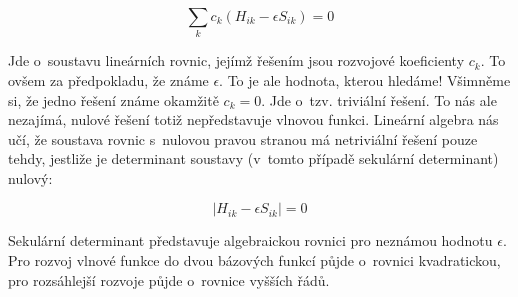   \begin{equation}
 \sum_k c_{k}\left(H_{ik}-\epsilon S_{ik}\right)=0
     \end{equation}
 
Jde o~soustavu lineárních rovnic, jejímž řešením jsou rozvojové koeficienty $c_k$. To ovšem za předpokladu, že známe $\epsilon$. To je ale hodnota, kterou hledáme! Všimněme si, že jedno řešení známe okamžitě $c_k=0$. Jde o~tzv. triviální řešení. To nás ale nezajímá, nulové řešení totiž nepředstavuje vlnovou funkci. Lineární algebra nás učí, že soustava rovnic s~nulovou pravou stranou má netriviální řešení pouze tehdy, jestliže je determinant soustavy (v~tomto případě sekulární determinant) nulový:
 
   \begin{equation}
 |H_{ik}-\epsilon S_{ik}|=0
     \end{equation}
 
Sekulární determinant představuje algebraickou rovnici pro neznámou hodnotu $\epsilon$. Pro rozvoj  vlnové funkce do dvou bázových funkcí půjde o~rovnici kvadratickou, pro rozsáhlejší rozvoje půjde o~rovnice vyšších řádů. 
 
